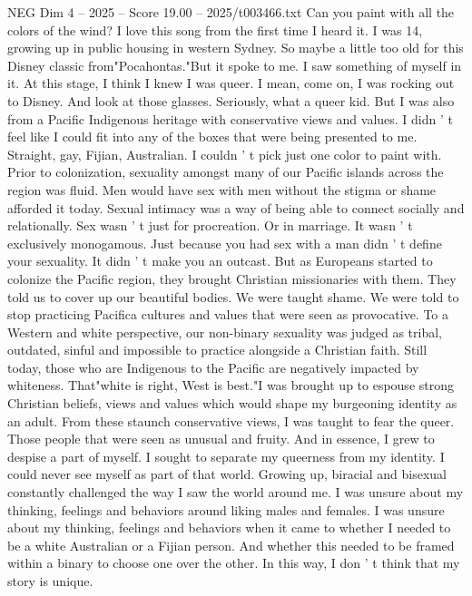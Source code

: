 \begin{textsample}{NEG Dim 4 – 2025 – Score 19.00 – 2025/t003466.txt}  \label{ex:f4_neg_082}
Can you paint with all the colors of the wind?
I love this song from the first time I heard it.
I was 14, growing up in public housing in western Sydney.
So maybe a little too old for this Disney classic from"Pocahontas."But it spoke to me.
I saw something of myself in it.
At this stage, I think I knew I was queer.
I mean, come on, I was rocking out to Disney.
And look at those glasses.
Seriously, what a queer kid.
But I was also from a Pacific Indigenous heritage with conservative views and values.
I didn ' t feel like I could fit into any of the boxes that were being presented to me.
Straight, gay, Fijian, Australian.
I couldn ' t pick just one color to paint with.
Prior to colonization, sexuality amongst many of our Pacific islands across the region was fluid.
Men would have sex with men without the stigma or shame afforded it today.
Sexual intimacy was a way of being able to connect socially and relationally.
Sex wasn ' t just for procreation.
Or in marriage.
It wasn ' t exclusively monogamous.
Just because you had sex with a man didn ' t define your sexuality.
It didn ' t make you an outcast.
But as Europeans started to colonize the Pacific region, they brought Christian missionaries with them.
They told us to cover up our beautiful bodies.
We were taught shame.
We were told to stop practicing Pacifica cultures and values that were seen as provocative.
To a Western and white perspective, our non-binary sexuality was judged as tribal, outdated, sinful and impossible to practice alongside a Christian faith.
Still today, those who are Indigenous to the Pacific are negatively impacted by whiteness.
That"white is right, West is best."I was brought up to espouse strong Christian beliefs, views and values which would shape my burgeoning identity as an adult.
From these staunch conservative views, I was taught to fear the queer.
Those people that were seen as unusual and fruity.
And in essence, I grew to despise a part of myself.
I sought to separate my queerness from my identity.
I could never see myself as part of that world.
Growing up, biracial and bisexual constantly challenged the way I saw the world around me.
I was unsure about my thinking, feelings and behaviors around liking males and females.
I was unsure about my thinking, feelings and behaviors when it came to whether I needed to be a white Australian or a Fijian person.
And whether this needed to be framed within a binary to choose one over the other.
In this way, I don ' t think that my story is unique.

\end{textsample}
